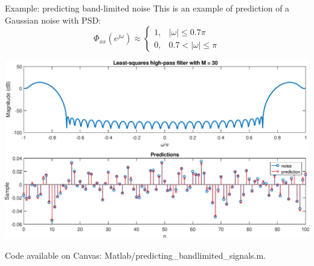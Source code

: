 \documentclass[10pt]{beamer}
\begin{document}
\begin{frame}{Example: predicting band-limited noise}
	This is an example of prediction of a Gaussian noise with PSD:
	\begin{equation*}
	\Phi_{xx}(e^{j\omega}) \approx \begin{cases}
	1, &|\omega|\leq 0.7\pi \\
	0, &0.7 < |\omega| \leq \pi 
	\end{cases}
	\end{equation*}
	\pause
	
	\begin{center}
		\includegraphics[scale=0.35]{figs/predicting_bandlimited_signals_example.eps}
	\end{center}

	Code available on Canvas: Matlab/predicting\_bandlimited\_signals.m.
\end{frame}
\end{document}
